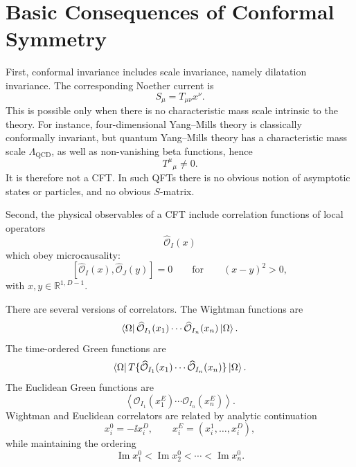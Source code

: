 \section{Basic Consequences of Conformal Symmetry}

First, conformal invariance includes scale invariance, namely
dilatation invariance.  The corresponding Noether current is
\[
  S_\mu=T_{\mu\nu}x^\nu.
\]
This is possible only when there is no characteristic mass scale
intrinsic to the theory.  For instance, four-dimensional Yang--Mills
theory is classically conformally invariant, but quantum Yang--Mills
theory has a characteristic mass scale \(\Lambda_{\mathrm{QCD}}\), as
well as non-vanishing beta functions, hence
\[
  T^\mu{}_\mu\neq0.
\]
It is therefore not a CFT.  In such QFTs there is no obvious notion of
asymptotic states or particles, and no obvious \(S\)-matrix.

Second, the physical observables of a CFT include correlation functions
of local operators
\[
  \widehat{\mathcal O}_I(x)
\]
which obey microcausality:
\[
  [\widehat{\mathcal O}_I(x),\widehat{\mathcal O}_J(y)]=0
  \qquad\text{for}\qquad (x-y)^2>0,
\]
with \(x,y\in\mathbb R^{1,D-1}\).

There are several versions of correlators.  The Wightman functions are
\[
  \bra{\Omega}
  \widehat{\mathcal O}_{I_1}(x_1)\cdots
  \widehat{\mathcal O}_{I_n}(x_n)
  \ket{\Omega}.
\]
The time-ordered Green functions are
\[
  \bra{\Omega}
  T\{\widehat{\mathcal O}_{I_1}(x_1)\cdots
  \widehat{\mathcal O}_{I_n}(x_n)\}
  \ket{\Omega}.
\]
The Euclidean Green functions are
\[
  \left\langle
  \mathcal O_{I_1}(x_1^E)\cdots \mathcal O_{I_n}(x_n^E)
  \right\rangle .
\]
Wightman and Euclidean correlators are related by analytic continuation
\[
  x_i^0=-\ii x_i^D,
  \qquad
  x_i^E=(x_i^1,\ldots,x_i^D),
\]
while maintaining the ordering
\[
  \operatorname{Im}x_1^0<
  \operatorname{Im}x_2^0<
  \cdots<
  \operatorname{Im}x_n^0.
\]

\begin{center}
\end{center}

